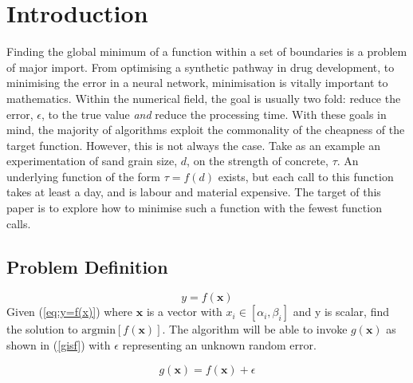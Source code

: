 
\chapter{Introduction}  %

\ifpdf
    \graphicspath{{Chapter1/Figs/Raster/}{Chapter1/Figs/PDF/}{Chapter1/Figs/}}
\else
    \graphicspath{{Chapter1/Figs/Vector/}{Chapter1/Figs/}}
\fi

Finding the global minimum of a function within a set of boundaries is a problem of major import. From optimising a synthetic pathway in drug development, to minimising the error in a neural network, minimisation is vitally important to mathematics. Within the numerical field, the goal is usually two fold: reduce the error, $\epsilon$, to the true value \textit{and} reduce the processing time. With these goals in mind, the majority of algorithms exploit the commonality of the cheapness of the target function. However, this is not always the case. Take as an example an experimentation of sand grain size, $d$, on the strength of concrete, $\tau$. An underlying function of the form $\tau=f(d)$ exists, but each call to this function takes at least a day, and is labour and material expensive. The target of this paper is to explore how to minimise such a function with the fewest function calls.
 
\section{Problem Definition}
\begin{equation}
    \label{eq:y=f(x)}
    y=f(\bm{x})
\end{equation}
Given (\ref{eq:y=f(x)}) where $\bm{x}$ is a vector with $x_i\in[\alpha_i, \beta_i]$ and y is scalar, find the solution to $\text{argmin}[f(\bm{x})]$. The algorithm will be able to invoke $g(\bm{x})$ as shown in (\ref{gisf}) with $\epsilon$ representing an unknown random error.

\begin{equation}
    \label{gisf}
    g(\bm{x}) = f(\bm{x}) + \epsilon
\end{equation}

